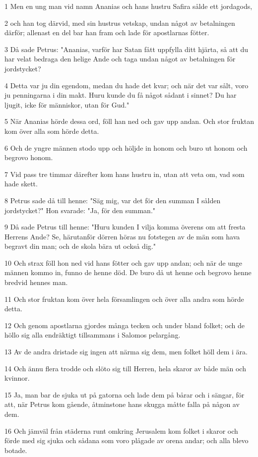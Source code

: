 \par 1 Men en ung man vid namn Ananias och hans hustru Safira sålde ett jordagods,
\par 2 och han tog därvid, med sin hustrus vetskap, undan något av betalningen därför; allenast en del bar han fram och lade för apostlarnas fötter.
\par 3 Då sade Petrus: "Ananias, varför har Satan fått uppfylla ditt hjärta, så att du har velat bedraga den helige Ande och taga undan något av betalningen för jordstycket?
\par 4 Detta var ju din egendom, medan du hade det kvar; och när det var sålt, voro ju penningarna i din makt. Huru kunde du få något sådant i sinnet? Du har ljugit, icke för människor, utan för Gud."
\par 5 När Ananias hörde dessa ord, föll han ned och gav upp andan. Och stor fruktan kom över alla som hörde detta.
\par 6 Och de yngre männen stodo upp och höljde in honom och buro ut honom och begrovo honom.
\par 7 Vid pass tre timmar därefter kom hans hustru in, utan att veta om, vad som hade skett.
\par 8 Petrus sade då till henne: "Säg mig, var det för den summan I sålden jordstycket?" Hon svarade: "Ja, för den summan."
\par 9 Då sade Petrus till henne: "Huru kunden I vilja komma överens om att fresta Herrens Ande? Se, härutanför dörren höras nu fotstegen av de män som hava begravt din man; och de skola bära ut också dig."
\par 10 Och strax föll hon ned vid hans fötter och gav upp andan; och när de unge männen kommo in, funno de henne död. De buro då ut henne och begrovo henne bredvid hennes man.
\par 11 Och stor fruktan kom över hela församlingen och över alla andra som hörde detta.
\par 12 Och genom apostlarna gjordes många tecken och under bland folket; och de höllo sig alla endräktigt tillsammans i Salomos pelargång.
\par 13 Av de andra dristade sig ingen att närma sig dem, men folket höll dem i ära.
\par 14 Och ännu flera trodde och slöto sig till Herren, hela skaror av både män och kvinnor.
\par 15 Ja, man bar de sjuka ut på gatorna och lade dem på bårar och i sängar, för att, när Petrus kom gående, åtminstone hans skugga måtte falla på någon av dem.
\par 16 Och jämväl från städerna runt omkring Jerusalem kom folket i skaror och förde med sig sjuka och sådana som voro plågade av orena andar; och alla blevo botade.
